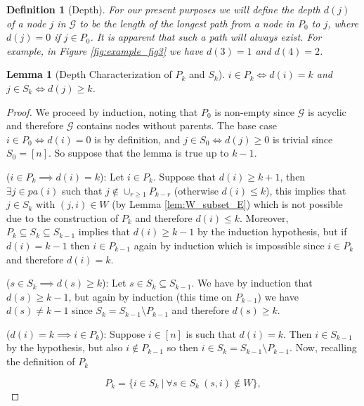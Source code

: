 \documentclass{statsoc}
\newcounter{lemma}
\newcounter{definition}
\def\gcg{\mathcal{G}}  %
\newcommand{\pa}[1]{pa(#1)}  %
\newtheorem{lemma}{Lemma}
\newtheorem{definition}{Definition}
\begin{document}
\begin{definition}[Depth]
  For our present purposes we will define the \textit{depth} $d(j)$ of
  a node $j$ in $\gcg$ to be the length of the \textit{longest} path
  from a node in $P_0$ to $j$, where $d(j) = 0$ if $j \in P_0$.  It is
  apparent that such a path will always exist.  For example, in Figure
  \ref{fig:example_fig3} we have $d(3) = 1$ and $d(4) = 2$.
\end{definition}

\begin{lemma}[Depth Characterization of $P_k$ and $S_k$]
  \label{lem:depth_lemma}
  $i \in P_k \iff d(i) = k$ and $j \in S_k \iff d(j) \ge k$.
\end{lemma}
\begin{proof}
  We proceed by induction, noting that $P_0$ is non-empty since $\gcg$
  is acyclic and therefore $\gcg$ contains nodes without parents.  The
  base case $i \in P_0 \iff d(i) = 0$ is by definition, and
  $j \in S_0 \iff d(j) \ge 0$ is trivial since $S_0 = [n]$.  So
  suppose that the lemma is true up to $k - 1$.

  ($i \in P_k \implies d(i) = k$): Let $i \in P_k$.  Suppose that
  $d(i) \ge k + 1$, then $\exists j \in \pa{i}$ such that
  $j \not\in \cup_{r \ge 1}P_{k - r}$ (otherwise $d(i) \le k$), this
  implies that $j \in S_k$ with $(j, i) \in W$ (by Lemma
  \ref{lem:W_subset_E}) which is not possible due to the construction of
  $P_k$ and therefore $d(i) \le k$.  Moreover,
  $P_k \subseteq S_k \subseteq S_{k - 1}$ implies that
  $d(i) \ge k - 1$ by the induction hypothesis, but if $d(i) = k - 1$
  then $i \in P_{k - 1}$ again by induction which is impossible since
  $i \in P_k$ and therefore $d(i) = k$.

  ($s \in S_k \implies d(s) \ge k$): Let
  $s \in S_k \subseteq S_{k - 1}$.  We have by induction that
  $d(s) \ge k - 1$, but again by induction (this time on $P_{k - 1}$)
  we have $d(s) \ne k - 1$ since $S_k = S_{k - 1} \setminus P_{k - 1}$
  and therefore $d(s) \ge k$.

  ($d(i) = k \implies i \in P_k$): Suppose $i \in [n]$ is such that
  $d(i) = k$.  Then $i \in S_{k - 1}$ by the hypothesis, but also
  $i \not\in P_{k - 1}$ so then
  $i \in S_k = S_{k - 1} \setminus P_{k - 1}$.  Now, recalling the
  definition of $P_k$

  \begin{equation*}
    P_k = \{i \in S_k\ |\ \forall s \in S_k\ (s, i) \not\in W \},
  \end{equation*}


\end{proof}
\end{document}
